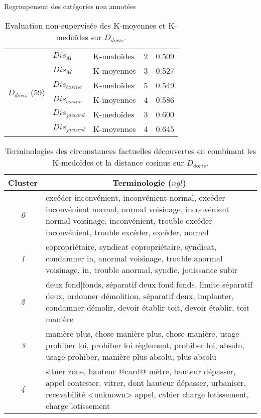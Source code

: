 \begin{frame}[c]{Regroupement des catégories non annotées}
	\newlength{\mrcell}
	\setlength{\mrcell}{0.8cm}
	\begin{table}[!htb]
		\tiny
		\begin{center}						
				\begin{tabular}[pos]{|l|l|l|c|c|}
					\hline				
					\multirow{6}{\mrcell}{${D}_{doris}$ (59)}  & $Dis_{M}$ & K-medoïdes & 2 & 0.509  \\ \cline{2-5}
					& $Dis_{M}$ & K-moyennes & 3 & 0.527  \\ \cline{2-5}
					& $Dis_{cosine}$ & K-medoïdes & 5 & 0.549 \\ \cline{2-5}
					& $Dis_{cosine}$ & K-moyennes & 4 & 0.586 \\ \cline{2-5}
					& $Dis_{jaccard}$ & K-medoïdes & 3 & 0.600 \\ \cline{2-5}
					& $Dis_{jaccard}$ & K-moyennes & 4 & 0.645 
					\\ \hline
				\end{tabular}
		\end{center}						
		\caption{\tiny Evaluation non-supervisée des K-moyennes et K-medoïdes sur ${D}_{doris}$.} \label{tab:similarite:validation-nonsupervisee}
	\end{table}
	\begin{table}[ht]
		\centering \tiny
		\begin{tabular}{|c|p{}|}
			\hline
			{Cluster} & \multicolumn{1}{c|}{Terminologie ($ngl$)} \\ \hline
			\textit{0} & excéder inconvénient, inconvénient normal, excéder inconvénient normal, normal voisinage, inconvénient normal voisinage, inconvénient, trouble excéder inconvénient, trouble excéder, excéder, normal
			\\ \hline
			\textit{1} & copropriétaire, syndicat copropriétaire, syndicat, condamner in, anormal voisinage, trouble anormal voisinage, in, trouble anormal, syndic, jouissance subir
			\\ \hline
			\textit{2} & deux fond|fonds, séparatif deux fond|fonds, limite séparatif deux, ordonner démolition, séparatif deux, implanter, condamner démolir, devoir établir toit, devoir établir, toit manière
			\\ \hline
			\textit{3} & manière plus, chose manière plus, chose manière, usage prohiber loi, prohiber loi règlement, prohiber loi, absolu, usage prohiber, manière plus absolu, plus absolu
			\\ \hline
			\textit{4} & situer zone, hauteur @card@ mètre, hauteur dépasser, appel contester, vitrer, dont hauteur dépasser, urbaniser, recevabilité <unknown> appel, cahier charge lotissement, charge lotissement
			\\ \hline
		\end{tabular}
		
		\caption{\tiny Terminologies des circonstances factuelles découvertes en combinant les K-medoïdes et la distance cosinus sur ${D}_{doris}$.}\label{tab:similarite:terminologie-clusters-doris}
	\end{table}
\end{frame}

